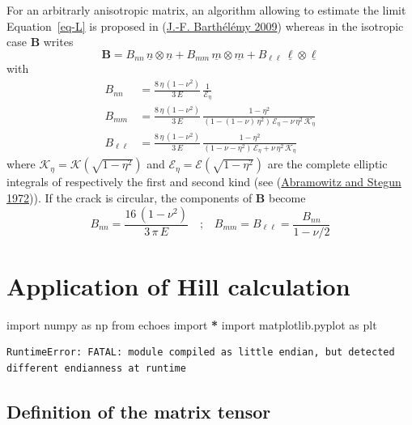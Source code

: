 \documentclass[
  letterpaper,
  DIV=11,
  numbers=noendperiod]{scrreprt}
\newenvironment{Shaded}{\begin{snugshade}}{\end{snugshade}}
\newcommand{\ImportTok}[1]{#1}
\newcommand{\NormalTok}[1]{#1}
\newcommand{\OperatorTok}[1]{\textcolor[rgb]{0.81,0.36,0.00}{\textbf{#1}}}
\begin{document}
For an arbitrarly anisotropic matrix, an algorithm allowing to estimate
the limit Equation~\ref{eq-L} is proposed in
(\protect\hyperlink{ref-barthelemy2009c}{J.-F. Barthélémy 2009}) whereas
in the isotropic case \({\mathbf{\boldsymbol{{B}}}}\) writes \[
{\mathbf{\boldsymbol{{B}}}}=
B_{nn}\,{\underline{{n}}}\otimes{\underline{{n}}}
+
B_{mm}\,{\underline{{m}}}\otimes{\underline{{m}}}
+
B_{\ell\ell}\,{\underline{{\ell}}}\otimes{\underline{{\ell}}}
\] with \[\begin{aligned}
B_{nn}&=\frac{8\,\eta\,(1-\nu^2)}{3\,E}\,
\frac{1}{\mathcal{E}_\eta}\label{eq:Bnn}\\
B_{mm}&=\frac{8\,\eta\,(1-\nu^2)}{3\,E}\,
\frac{1-\eta^2}{\left(1-(1-\nu)\,\eta^2\right)
\,\mathcal{E}_\eta-\nu\,\eta^2\,\mathcal{K}_\eta}\\
B_{\ell\ell}&=\frac{8\,\eta\,(1-\nu^2)}{3\,E}\,
\frac{1-\eta^2}{(1-\nu-\eta^2)\,\mathcal{E}_\eta+\nu\,\eta^2\,\mathcal{K}_\eta}
\end{aligned}\] where \(\mathcal{K}_\eta=\mathcal{K}(\sqrt{1-\eta^2})\)
and \(\mathcal{E}_\eta=\mathcal{E}(\sqrt{1-\eta^2})\) are the complete
elliptic integrals of respectively the first and second kind (see
(\protect\hyperlink{ref-abramowitz1972}{Abramowitz and Stegun 1972})).
If the crack is circular, the components of
\({\mathbf{\boldsymbol{{B}}}}\) become \[
B_{nn}=\frac{16\,(1-\nu^2)}{3\,\pi\,E}
\quad\textrm{;}\quad
B_{mm}=B_{\ell\ell}=\frac{B_{nn}}{1-\nu/2}
\]

\hypertarget{application-of-hill-calculation}{%
\section{Application of Hill
calculation}\label{application-of-hill-calculation}}

\begin{Shaded}
\begin{Highlighting}[]
\ImportTok{import}\NormalTok{ numpy }\ImportTok{as}\NormalTok{ np}
\ImportTok{from}\NormalTok{ echoes }\ImportTok{import} \OperatorTok{*}
\ImportTok{import}\NormalTok{ matplotlib.pyplot }\ImportTok{as}\NormalTok{ plt}
\end{Highlighting}
\end{Shaded}

\begin{verbatim}
RuntimeError: FATAL: module compiled as little endian, but detected different endianness at runtime
\end{verbatim}

\hypertarget{definition-of-the-matrix-tensor}{%
\subsection{Definition of the matrix
tensor}\label{definition-of-the-matrix-tensor}}
\end{document}
